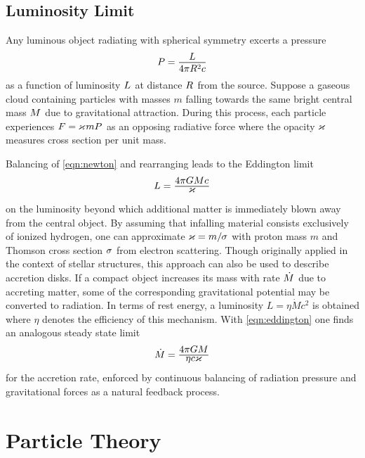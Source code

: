 \subsection*{Luminosity Limit}

Any luminous object radiating with spherical symmetry excerts a pressure
\begin{equation*}
	P = \frac{\raisebox{-0.3ex}{$L$}}{4\pi R^2 c}
\end{equation*}
as a function of luminosity $L \kern+0.5pt$ at distance $R \kern+0.5pt$ from the source.
Suppose a gaseous cloud containing particles with masses $m$ falling towards the same bright central mass $M \kern+0.5pt$
due to gravitational attraction. During this process, each particle experiences $F = \kern-0.3pt \varkappa \kern+0.7pt mP \kern+0.5pt$
as an opposing radiative force where the opacity $\kern-0.3pt \varkappa \kern+0.7pt$ measures cross section per unit mass.

\newpage Balancing of \eqref{eqn:newton} and rearranging leads to the Eddington limit
\begin{equation}
	L = \frac{\raisebox{-0.3ex}{$4\pi GM c \kern+0.4pt$}}{\raisebox{0.8ex}{$\varkappa$}}
	\label{eqn:eddington}
\end{equation}
on the luminosity beyond which additional matter is immediately blown away from the central object. By assuming that infalling
material consists exclusively of ionized hydrogen, one can approximate $\varkappa \kern-0.1pt = m / \kern-0.5pt \sigma \kern+0.3pt$
with proton mass $m$ and Thomson cross section $\sigma \kern+0.5pt$ from electron scattering. Though originally applied in the
context of stellar structures, this approach can also be used to describe accretion disks. If a compact object increases its mass
with rate $\dot{M} \kern+0.5pt$ due to accreting matter, some of the corresponding gravitational potential may be converted to
radiation. In terms of rest energy, a luminosity $L = \eta\dot{M}c^2$ is obtained where $\eta$ denotes the efficiency of this
mechanism. With \eqref{eqn:eddington} one finds an analogous steady state limit
\begin{equation*}
	\dot{M} \kern-0.2pt = \frac{\raisebox{-0.3ex}{$4\pi GM$}}{\raisebox{0.8ex}{$\eta c \varkappa$}}
\end{equation*}
for the accretion rate, enforced by continuous balancing of radiation pressure and gravitational forces as a natural feedback process.


\section{Particle Theory}
\label{sec:theory}



